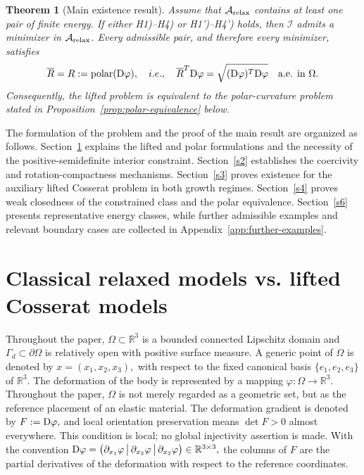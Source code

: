 \documentclass[11pt]{article}
\newtheorem{theorem}{Theorem}[section]
\begin{document}
\begin{theorem}[Main existence result]
\label{thm:elastic1}
Assume that $\mathcal A_{\rm relax}$ contains at least one pair of finite energy. If either H1)--H4) or H1')--H4') holds, then $\mathcal I$ admits a minimizer in $\mathcal A_{\rm relax}$. Every admissible pair, and therefore every minimizer, satisfies
\begin{align}
  \overline  R =R:
=
\operatorname{polar}({\rm D}\varphi),
\quad  i.e., \quad 
 \overline  R ^T{\rm D}\varphi
=
\sqrt{({\rm D}\varphi)^T{\rm D}\varphi}
\quad\text{a.e. in }\Omega.
\end{align}
Consequently, the lifted problem is equivalent to the polar-curvature problem stated in Proposition~\ref{prop:polar-equivalence} below.
\end{theorem}

The formulation of the problem and the proof of the main result are
organized as follows. Section~\ref{s1} explains the lifted and polar formulations and the necessity of the positive-semidefinite interior constraint. Section~\ref{s2} establishes the coercivity and rotation-compactness mechanisms. Section~\ref{s3} proves existence for the auxiliary lifted Cosserat problem in both growth regimes. Section~\ref{s4} proves weak closedness of the constrained class and the polar equivalence. Section~\ref{s6} presents representative energy classes, while further admissible examples and relevant boundary cases are collected in Appendix~\ref{app:further-examples}.


\section{Classical relaxed models vs. lifted Cosserat models }
\label{s1}\setcounter{equation}{0}


Throughout the paper, $\Omega\subset\mathbb R^3$ is a bounded connected Lipschitz domain and $\Gamma_d\subset\partial\Omega$ is relatively open with positive surface measure. A generic point of \(\Omega\) is denoted by
$
        x=(x_1,x_2,x_3),
$
with respect to the fixed canonical basis
$
        \{e_1,e_2,e_3\}
$
of \(\mathbb R^3\). The deformation of the body is represented by a mapping
$
        \varphi:\Omega\to\mathbb R^3 .
$
Throughout the paper, \(\Omega\) is not merely regarded as a geometric set, but
as the reference placement of an elastic material. 
The deformation gradient is denoted by
$
F:={\rm D}\varphi,
$
and local orientation preservation means $\det F>0$ almost everywhere. This condition is local; no global injectivity assertion is made. With the convention
$
        {\rm D}\varphi
        =
        \big(
        \partial_{x_1}\varphi\,
        \big|\,
        \partial_{x_2}\varphi\,
        \big|\,
        \partial_{x_3}\varphi
        \big)
        \in\mathbb R^{3\times3},
$
the columns of \(F\) are the partial derivatives of the deformation with
respect to the reference coordinates. 
\end{document}
